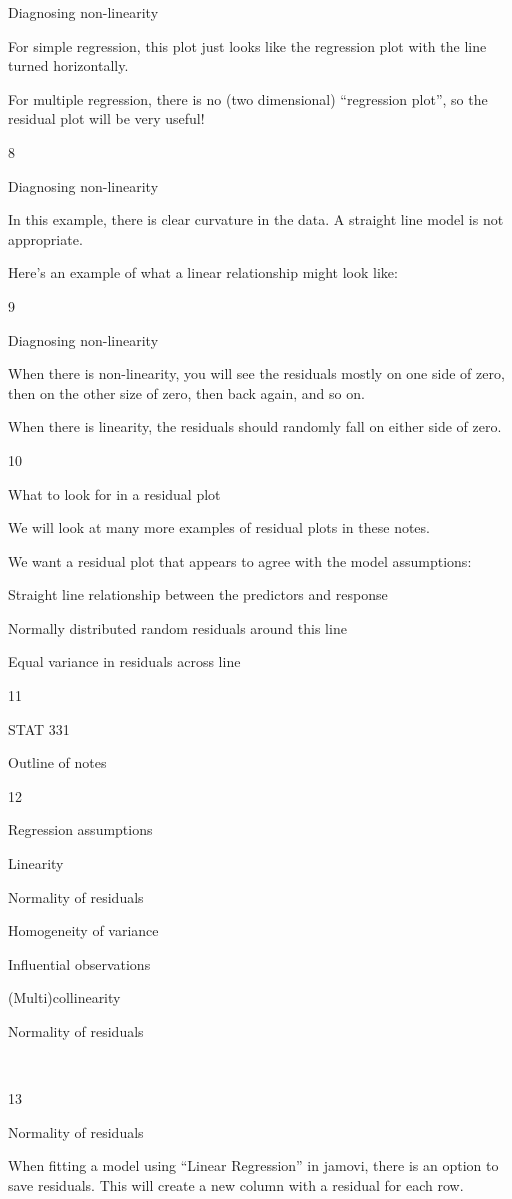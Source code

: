 \documentclass[
  letterpaper,
  DIV=11,
  numbers=noendperiod]{scrreprt}
\begin{document}
Diagnosing non-linearity

For simple regression, this plot just looks like the regression plot
with the line turned horizontally.

For multiple regression, there is no (two dimensional) ``regression
plot'', so the residual plot will be very useful!

8

Diagnosing non-linearity

In this example, there is clear curvature in the data. A straight line
model is not appropriate.

Here's an example of what a linear relationship might look like:

9

Diagnosing non-linearity

When there is non-linearity, you will see the residuals mostly on one
side of zero, then on the other size of zero, then back again, and so
on.

When there is linearity, the residuals should randomly fall on either
side of zero.

10

What to look for in a residual plot

We will look at many more examples of residual plots in these notes.

We want a residual plot that appears to agree with the model
assumptions:

Straight line relationship between the predictors and response

Normally distributed random residuals around this line

Equal variance in residuals across line

11

STAT 331

Outline of notes

12

Regression assumptions

Linearity

Normality of residuals

Homogeneity of variance

Influential observations

(Multi)collinearity

Normality of residuals

~

13

Normality of residuals

When fitting a model using ``Linear Regression'' in jamovi, there is an
option to save residuals. This will create a new column with a residual
for each row.
\end{document}
